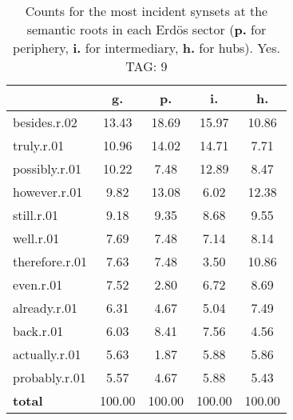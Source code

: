 \begin{table}[h!]
\begin{center}
\begin{tabular}{| l || c | c | c | c |}\hline
 & {\bf g.} & {\bf p.} & {\bf i.} & {\bf h.} \\\hline\hline
besides.r.02 & 13.43  & 18.69  & 15.97  & 10.86 \\\hline
truly.r.01 & 10.96  & 14.02  & 14.71  & 7.71 \\\hline
possibly.r.01 & 10.22  & 7.48  & 12.89  & 8.47 \\\hline
however.r.01 & 9.82  & 13.08  & 6.02  & 12.38 \\\hline
still.r.01 & 9.18  & 9.35  & 8.68  & 9.55 \\\hline
well.r.01 & 7.69  & 7.48  & 7.14  & 8.14 \\\hline
therefore.r.01 & 7.63  & 7.48  & 3.50  & 10.86 \\\hline
even.r.01 & 7.52  & 2.80  & 6.72  & 8.69 \\\hline
already.r.01 & 6.31  & 4.67  & 5.04  & 7.49 \\\hline
back.r.01 & 6.03  & 8.41  & 7.56  & 4.56 \\\hline
actually.r.01 & 5.63  & 1.87  & 5.88  & 5.86 \\\hline
probably.r.01 & 5.57  & 4.67  & 5.88  & 5.43 \\\hline\hline
{{\bf total}} & 100.00  & 100.00  & 100.00  & 100.00 \\\hline
\end{tabular}
\caption{Counts for the most incident synsets at the semantic roots in each Erd\"os sector ({\bf p.} for periphery, {\bf i.} for intermediary, {\bf h.} for hubs). Yes. TAG: 9}
\end{center}
\end{table}